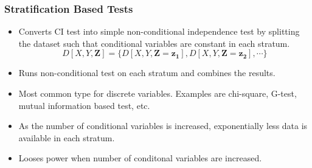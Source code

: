 \documentclass{beamer}
\begin{document}
\begin{frame}
	\frametitle{Stratification Based Tests}
	\begin{itemize}
		\setlength\itemsep{1em}
		\item Converts CI test into simple non-conditional independence test by splitting 
			the dataset such that conditional variables are constant in each stratum. \newline
			$$ D[X, Y, \bm{Z}] = \{ D[X, Y, \bm{Z}=\bm{z_1}], D[X, Y, \bm{Z}=\bm{z_2}], \cdots \} $$
		\item Runs non-conditional test on each stratum and combines the results.
		\item Most common type for discrete variables. Examples are chi-square, G-test,
			mutual information based test, etc. 
 		\item As the number of conditional variables is increased, exponentially
 			less data is available in each stratum.
 		\item Looses power when number of conditonal variables
 			are increased.
	\end{itemize}
\end{frame}
\end{document}
